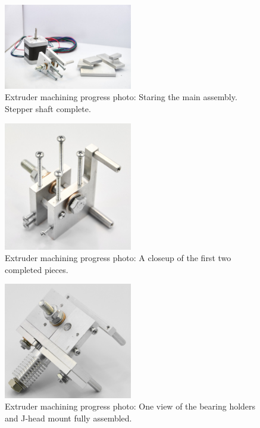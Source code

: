 
\begin{figure}[h!]
\centering
\includegraphics[width=0.5\textwidth]{./figures/extruder-progress-1}
\caption{Extruder machining progress photo: Staring the main assembly. Stepper shaft complete.}
\label{fig:extruder-progress-1}
\end{figure}

\begin{figure}[h!]
\centering
\includegraphics[width=0.5\textwidth]{./figures/extruder-progress-2}
\caption{Extruder machining progress photo: A closeup of the first two completed pieces.}
\label{fig:extruder-progress-2}
\end{figure}

\begin{figure}[h!]
\centering
\includegraphics[width=0.5\textwidth]{./figures/extruder-progress-3}
\caption{Extruder machining progress photo: One view of the bearing holders and J-head mount fully assembled.}
\label{fig:extruder-progress-3}
\end{figure}

